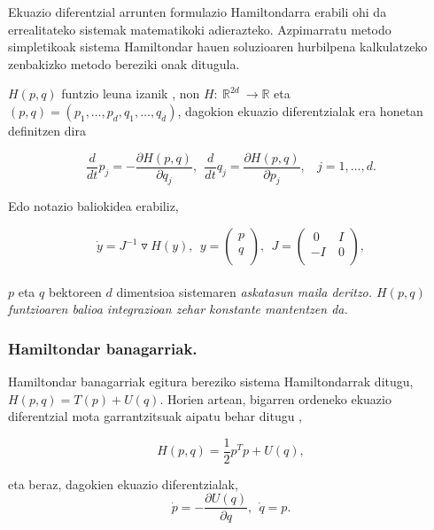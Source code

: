 Ekuazio diferentzial arrunten formulazio Hamiltondarra erabili ohi da errealitateko sistemak matematikoki adierazteko. Azpimarratu metodo simpletikoak sistema Hamiltondar hauen soluzioaren hurbilpena kalkulatzeko zenbakizko metodo bereziki onak ditugula. 

$H(p,q)$ funtzio leuna izanik , non  $H: \ {\mathbb{R}}^{2d} \ \longrightarrow {\mathbb{R}}$ eta $(p,q)=(p_1, \dots , p_d,q_1, \dots , q_d)$,  dagokion ekuazio diferentzialak era honetan definitzen dira

\begin{equation}\label{eq:11}
\frac{d}{dt}{p}_j=-\frac{\partial H(p,q)}{\partial q_j}, \ \ \frac{d}{dt}{q}_j=\frac{\partial H(p,q)}{\partial p_j}, \ \ \ \ j=1,\dots,d.
\end{equation} 

Edo notazio baliokidea erabiliz,

\begin{equation}
\dot{y}=J^{-1}\triangledown H(y),\ \ 
y=\left(\begin{array}{c}
  p \\
  q \\
  \end{array}\right), \ \
J=\left(\begin{array}{cc}
  \ 0 & \ I \\
   -I & \ 0 \\
\end{array}\right),  
\end{equation}

\paragraph*{}$p$ eta $q$ bektoreen $d$ dimentsioa sistemaren \it{askatasun maila} deritzo. $H(p,q)$ funtzioaren balioa integrazioan zehar konstante mantentzen da.

\subsubsection*{Hamiltondar banagarriak.}

Hamiltondar banagarriak egitura bereziko sistema Hamiltondarrak ditugu, $H(p,q)=T(p)+U(q)$. Horien artean, bigarren ordeneko ekuazio diferentzial mota garrantzitsuak aipatu behar ditugu ,  

\begin{equation*}
H(p,q)=\frac{1}{2}p^Tp +U(q),
\end{equation*}

eta beraz, dagokien ekuazio diferentzialak,
\begin{equation*}
\dot{p}=-\frac{\partial U(q)}{\partial q}, \ \ \dot{q}=p. 
\end{equation*}

